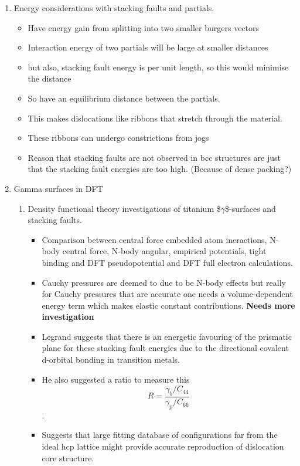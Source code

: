 \documentclass[11pt]{article}
\begin{document}
\begin{enumerate}
\item Energy considerations with stacking faults and partials.
\label{sec:org9a4e740}
\begin{itemize}
\item Have energy gain from splitting into two smaller burgers vectors
\item Interaction energy of two partials will be large at smaller distances
\item but also, stacking fault energy is per unit length, so this would
minimise the distance
\item So have an equilibrium distance between the partials.
\item This makes dislocations like ribbons that stretch through the material.
\item These ribbons can undergo constrictions from jogs
\item Reason that stacking faults are not observed in bcc structures are just
that the stacking fault energies are too high. (Because of dense packing?)
\end{itemize}
\item Gamma surfaces in DFT
\label{sec:org9bdf34a}
\begin{enumerate}
\item{} Density functional theory investigations of titanium \$\(\gamma\)\$-surfaces and stacking faults.
\label{sec:org27f644b}
\begin{itemize}
\item Comparison between central force  embedded atom ineractions, N-body
central force, N-body angular, empirical potentials, tight binding and
DFT pseudopotential and DFT full electron calculations.
\item Cauchy pressures are deemed to due to be N-body effects but really for Cauchy
pressures that are accurate one needs a volume-dependent energy term
which makes elastic constant contributions. \textbf{\textbf{Needs more investigation}}
\item Legrand suggests that there is an energetic favouring of the prismatic
plane for these stacking fault energies due to the directional covalent
d-orbital bonding in transition metals.
\item He also suggested a ratio to measure this \[ R = \frac{\gamma_{b}/C_{44}}{\gamma_{p}/C_{66}} \].
\item Suggests that large fitting database of configurations far from the
ideal hcp lattice might provide accurate reproduction of dislocation
core structure.

\end{itemize}
\end{enumerate}
\end{enumerate}
\end{document}
